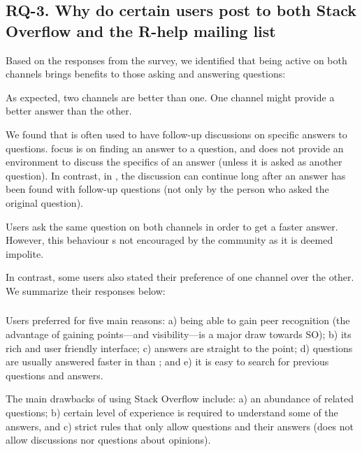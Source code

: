 \subsection{RQ-3. Why do certain users post to both Stack Overflow and the R-help mailing list}

Based on the responses from the survey, we identified that being active on both channels brings benefits to those asking and answering questions:

\begin{description}[itemsep=2pt, topsep=0pt, leftmargin=1em, parsep=0pt]
\item[Find a better answer:] As expected, two channels are better than one. 
  One channel might provide a better answer than the other.
\item[Support follow-up questions:] We found that \RH is often used to have follow-up discussions on
  specific answers to \SO questions. \SO focus is on finding an answer to a question, and does not
  provide an environment to discuss the specifics of an answer (unless it is asked as another question).
In contrast, in \RH, the discussion can continue long after an answer has been found with follow-up questions (not only by the person who asked the original question).  
\item[Speeds up answers:] Users ask the same question on both channels in order to get a faster answer. However, this behaviour s not encouraged by the community as it is deemed impolite.\cn
\end{description}

In contrast, some users also stated their preference of one channel over the other. We summarize their responses below:
 

\subsubsection{\SO}

Users preferred \SO for five main reasons:
a) being able to gain peer recognition (the advantage of gaining points---and visibility---is a major draw towards SO);
b) its rich and user friendly interface;
c) answers are straight to the point;
d) questions are usually answered faster in \SO than \RH; and e) it is easy to search for previous questions and answers.

The main drawbacks of using Stack Overflow include: a) an abundance
    of related questions; b) certain level of experience is required to understand some of the answers, and c) \SO strict rules that only allow questions and their answers (\SO does not allow discussions nor questions about opinions).



